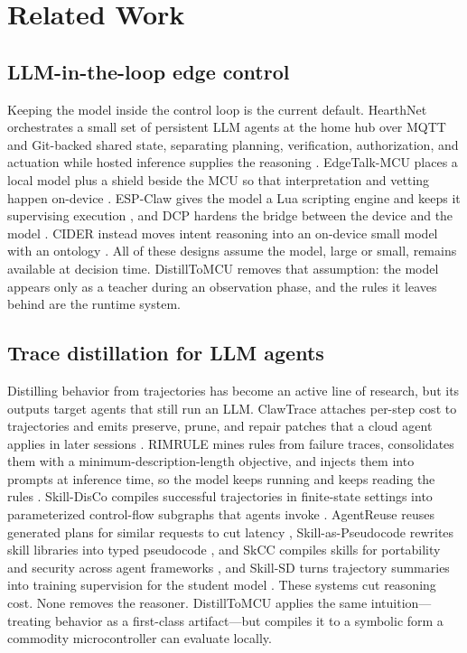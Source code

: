 \documentclass[review]{elsarticle}
\begin{document}
\section{Related Work}

\subsection{LLM-in-the-loop edge control}

Keeping the model inside the control loop is the current default. HearthNet
orchestrates a small set of persistent LLM agents at the home hub over MQTT
and Git-backed shared state, separating planning, verification, authorization,
and actuation while hosted inference supplies the reasoning \cite{1}.
EdgeTalk-MCU places a local model plus a shield beside the MCU so that
interpretation and vetting happen on-device \cite{2}. ESP-Claw gives the model
a Lua scripting engine and keeps it supervising execution \cite{3}, and DCP
hardens the bridge between the device and the model \cite{4}. CIDER instead
moves intent reasoning into an on-device small model with an ontology
\cite{13}. All of these designs assume the model, large or small, remains
available at decision time. DistillToMCU removes that assumption: the model
appears only as a teacher during an observation phase, and the rules it
leaves behind are the runtime system.

\subsection{Trace distillation for LLM agents}

Distilling behavior from trajectories has become an active line of research,
but its
outputs target agents that still run an LLM. ClawTrace attaches per-step cost
to trajectories and emits preserve, prune, and repair patches that a cloud
agent applies in later sessions \cite{5}. RIMRULE mines rules from failure
traces, consolidates them with a minimum-description-length objective, and
injects them into prompts at inference time, so the model keeps running and
keeps reading the rules \cite{6}. Skill-DisCo compiles successful trajectories
in finite-state settings into parameterized control-flow subgraphs that
agents invoke \cite{7}. AgentReuse reuses generated plans for similar requests
to cut latency \cite{8}, Skill-as-Pseudocode rewrites skill libraries into
typed pseudocode \cite{9}, and SkCC compiles skills for portability and
security across agent frameworks \cite{10}, and Skill-SD turns trajectory
summaries into training supervision for the student model \cite{14}. These
systems cut reasoning cost. None removes the reasoner. DistillToMCU
applies the same intuition---treating behavior as a first-class artifact---but
compiles it to a symbolic form a commodity microcontroller can evaluate
locally.
\end{document}
